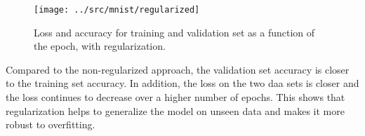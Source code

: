 \begin{answer}
    \begin{figure}
        \centering
        \texttt{[image: ../src/mnist/regularized]}
        \caption{Loss and accuracy for training and validation set as a function of the epoch, with regularization.}
    \end{figure}

Compared to the non-regularized approach, the validation set accuracy is closer to the training set accuracy.
In addition, the loss on the two daa sets is closer and the loss continues to decrease over a higher number of epochs.
This shows that regularization helps to generalize the model on unseen data and makes it more robust to overfitting.
\end{answer}
   
  
